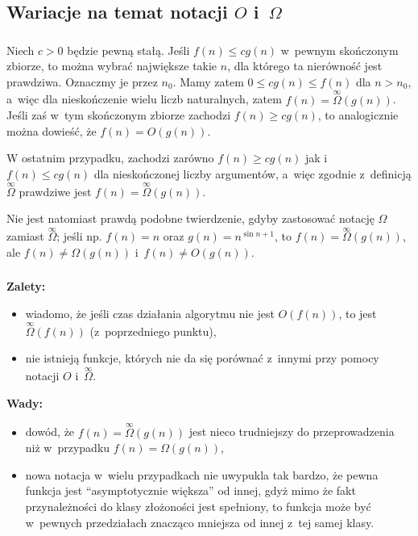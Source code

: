 \subsection{Wariacje na temat notacji $O$ i~$\Omega$} %

\subsubsection{} %
Niech $c>0$ będzie pewną stałą. Jeśli $f(n)\le cg(n)$ w~pewnym skończonym zbiorze, to można wybrać największe takie $n$, dla którego ta nierówność jest prawdziwa. Oznaczmy je przez $n_0$. Mamy zatem $0\le cg(n)\le f(n)$ dla $n>n_0$, a~więc dla nieskończenie wielu liczb naturalnych, zatem $f(n)=\overset{\infty}{\Omega}(g(n))$. Jeśli zaś w~tym skończonym zbiorze zachodzi $f(n)\ge cg(n)$, to analogicznie można dowieść, że $f(n)=O(g(n))$.

W ostatnim przypadku, zachodzi zarówno $f(n)\ge cg(n)$ jak i~$f(n)\le cg(n)$ dla nieskończonej liczby argumentów, a~więc zgodnie z~definicją $\overset{\infty}{\Omega}$ prawdziwe jest $f(n)=\overset{\infty}{\Omega}(g(n))$.

Nie jest natomiast prawdą podobne twierdzenie, gdyby zastosować notację $\Omega$ zamiast $\overset{\infty}{\Omega}$; jeśli np. $f(n)=n$ oraz $g(n)=n^{\sin n+1}$, to $f(n)=\overset{\infty}{\Omega}(g(n))$, ale $f(n)\ne\Omega(g(n))$ i~$f(n)\ne O(g(n))$.

\subsubsection{} %
\textbf{Zalety:}
\begin{itemize}
	\item wiadomo, że jeśli czas działania algorytmu nie jest $O(f(n))$, to jest $\overset{\infty}{\Omega}(f(n))$ (z~poprzedniego punktu),
	\item nie istnieją funkcje, których nie da się porównać z~innymi przy pomocy notacji $O$ i~$\overset{\infty}{\Omega}$.
\end{itemize}
\textbf{Wady:}
\begin{itemize}
	\item dowód, że $f(n)=\overset{\infty}{\Omega}(g(n))$ jest nieco trudniejszy do przeprowadzenia niż w~przypadku $f(n)=\Omega(g(n))$,
	\item nowa notacja w~wielu przypadkach nie uwypukla tak bardzo, że pewna funkcja jest ``asymptotycznie większa'' od innej, gdyż mimo że fakt przynależności do klasy złożoności jest spełniony, to funkcja może być w~pewnych przedziałach znacząco mniejsza od innej z~tej samej klasy.
\end{itemize}

